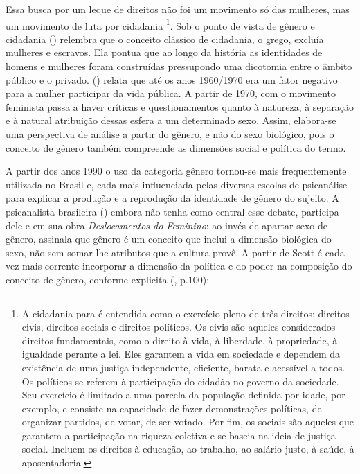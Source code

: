 Essa busca por um leque de direitos não foi um movimento só das mulheres, mas um movimento de luta por cidadania
\footnote{A cidadania para \cite{CARVALHO2002} é entendida como o exercício pleno de três direitos: direitos civis, direitos sociais e direitos políticos. Os civis são aqueles considerados direitos fundamentais, como o direito à vida, à liberdade, à propriedade, à igualdade perante a lei. Eles garantem a vida em sociedade e dependem da existência de uma justiça independente, eficiente, barata e acessível a todos. Os políticos se referem à participação do cidadão no governo da sociedade. Seu exercício é limitado a uma parcela da população definida por idade, por exemplo, e consiste na capacidade de fazer demonstrações políticas, de organizar partidos, de votar, de ser votado. Por fim, os sociais são aqueles que garantem a participação na riqueza coletiva e se baseia na ideia de justiça social. Incluem os direitos à educação, ao trabalho, ao salário justo, à saúde, à aposentadoria.}. Sob o ponto de vista de gênero e cidadania  (\citeyear{BRITO2001}) relembra que o conceito clássico de cidadania, o grego, excluía mulheres e escravos. Ela pontua que ao longo da história as identidades de homens e mulheres foram construídas pressupondo uma dicotomia entre o âmbito público e o privado.  (\citeyear{BLAY2001}) relata que até os anos 1960/1970 era um fator negativo para a mulher participar da vida pública.
A partir de 1970, com o movimento feminista passa a haver críticas e questionamentos quanto à natureza, à separação e à natural atribuição dessas esfera a um determinado sexo. Assim, elabora-se uma perspectiva de análise a partir do gênero, e não do sexo biológico, pois o conceito de gênero também compreende as dimensões social e política do termo.

A partir dos anos 1990 o uso da categoria gênero tornou-se mais frequentemente utilizada no Brasil e, cada mais influenciada pelas diversas escolas de psicanálise para explicar a produção e a reprodução da identidade de gênero do sujeito.
A psicanalista brasileira  (\citeyear{KEHL1998}) embora não tenha como central esse debate, participa dele e em sua obra \emph{Deslocamentos do Feminino}: ao invés de apartar sexo de gênero, assinala que gênero é um conceito que inclui a dimensão biológica do sexo, não sem somar-lhe atributos que a cultura provê.
A partir de Scott é cada vez mais corrente incorporar a dimensão da política e do poder na composição do conceito de gênero, conforme explicita  (\citeyear{MORAES1998}, p.100):

